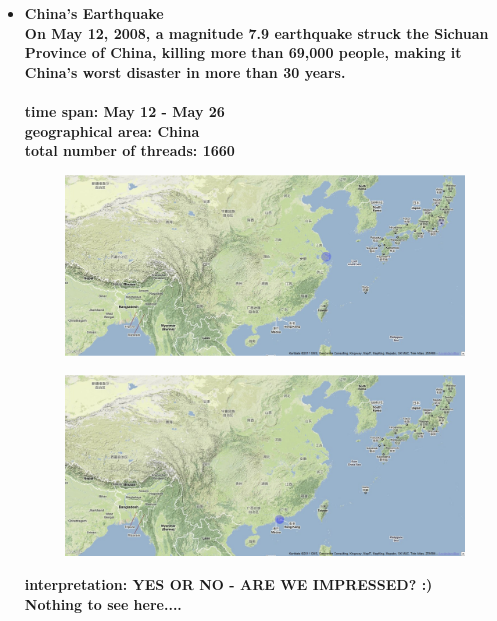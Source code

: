 \documentclass[11pt,a4paper,english]{article}
\begin{document}
\begin{itemize}
					
					
					\item \bf China's Earthquake \rm
						\\On May 12, 2008, a magnitude 7.9 earthquake struck the Sichuan Province of China, killing more than 69,000 people, making it China's worst disaster in more than 30 years.
						\\\\ \bf time span: \rm May 12 - May 26
						\\ \bf geographical area: \rm China
						\\ \bf total number of threads: \rm 1660
						\begin{figure}[H]
							\vspace{-13pt}
  							\begin{center}
								\includegraphics[width=130mm]{img/pre-china}
							\end{center}
							\vspace{-13pt}
						\end{figure}
						\begin{figure}[H]
							\vspace{-13pt}
	  						\begin{center}
								\includegraphics[width=130mm]{img/post-china}
							\end{center}
							\vspace{-13pt}
						\end{figure}						
						\bf interpretation: \rm YES OR NO - ARE WE IMPRESSED? :)
						\\ Nothing to see here....
						

\end{itemize}
\end{document}
